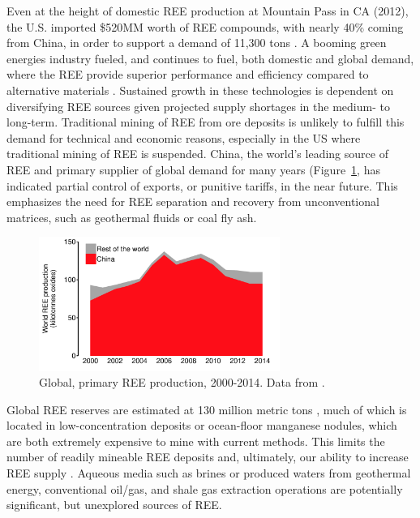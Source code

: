 Even at the height of domestic REE production at Mountain Pass in CA (2012), the U.S. imported \$520MM worth of REE compounds, with nearly 40\% coming from China, in order to support a demand of 11,300 tons \citep{USGS_minyb_2012}.
A booming green energies industry fueled, and continues to fuel, both domestic and global demand, where the REE provide superior performance and efficiency compared to alternative materials \citep{Nassar_JIE_2015, Graedel_PNAS_2015}.
Sustained growth in these technologies is dependent on diversifying REE sources given projected supply shortages in the medium- to long-term.
Traditional mining of REE from ore deposits is unlikely to fulfill this demand for technical and economic reasons, especially in the US where traditional mining of REE is suspended.
China, the world's leading source of REE and primary supplier of global demand for many years (Figure~\ref{fig:world-REO-prod}, has indicated partial control of exports, or punitive tariffs, in the near future.
This emphasizes the need for REE separation and recovery from unconventional matrices, such as geothermal fluids or coal fly ash.

\begin{figure}[htbp]
\begin{center}
\includegraphics[width = 0.7\textwidth]{proposal_figures/World-REO-production.pdf}
\caption{Global, primary REE production, 2000-2014.
Data from \citet{USGS_commsumm}.}\label{fig:world-REO-prod}
\end{center}
\end{figure}

Global REE reserves are estimated at 130 million metric tons \citep{USGS_commsumm}, much of which is located in low-concentration deposits or ocean-floor manganese nodules, which are both extremely expensive to mine with current methods.
This limits the number of readily mineable REE deposits and, ultimately, our ability to increase REE supply \citep{JRC_2011, Alonso_EST_2012}.
Aqueous media such as brines or produced waters from geothermal energy, conventional oil/gas, and shale gas extraction operations are potentially significant, but unexplored sources of REE.

